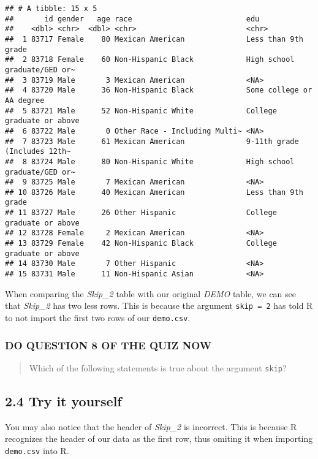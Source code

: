 \documentclass[
]{book}
\begin{document}
\begin{verbatim}
## # A tibble: 15 x 5
##       id gender   age race                          edu
##    <dbl> <chr>  <dbl> <chr>                         <chr>
##  1 83717 Female    80 Mexican American              Less than 9th grade
##  2 83718 Female    60 Non-Hispanic Black            High school graduate/GED or~
##  3 83719 Male       3 Mexican American              <NA>
##  4 83720 Male      36 Non-Hispanic Black            Some college or AA degree
##  5 83721 Male      52 Non-Hispanic White            College graduate or above
##  6 83722 Male       0 Other Race - Including Multi~ <NA>
##  7 83723 Male      61 Mexican American              9-11th grade (Includes 12th~
##  8 83724 Male      80 Non-Hispanic White            High school graduate/GED or~
##  9 83725 Male       7 Mexican American              <NA>
## 10 83726 Male      40 Mexican American              Less than 9th grade
## 11 83727 Male      26 Other Hispanic                College graduate or above
## 12 83728 Female     2 Mexican American              <NA>
## 13 83729 Female    42 Non-Hispanic Black            College graduate or above
## 14 83730 Male       7 Other Hispanic                <NA>
## 15 83731 Male      11 Non-Hispanic Asian            <NA>
\end{verbatim}

When comparing the \emph{Skip\_2} table with our original \emph{DEMO} table, we can see that \emph{Skip\_2} has two less rows. This is because the argument \texttt{skip\ =\ 2} has told R to not import the first two rows of our \texttt{demo.csv}.

\hypertarget{do-question-8-of-the-quiz-now-1}{%
\subsubsection{DO QUESTION 8 OF THE QUIZ NOW}\label{do-question-8-of-the-quiz-now-1}}

\begin{quote}
Which of the following statements is true about the argument \texttt{skip}?
\end{quote}

\hypertarget{try-it-yourself-12}{%
\subsection{2.4 Try it yourself}\label{try-it-yourself-12}}

You may also notice that the header of \emph{Skip\_2} is incorrect. This is because R recognizes the header of our data as the first row, thus omiting it when importing \texttt{demo.csv} into R.
\end{document}
